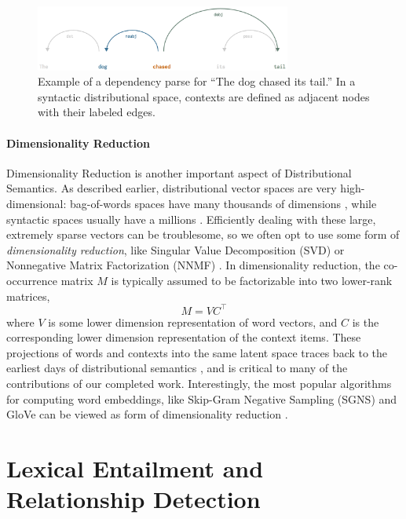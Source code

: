 \begin{figure}
  \centering
  \includegraphics[width=0.75\textwidth]{figures/syn}
\caption{Example of a dependency parse for ``The dog chased its tail.'' In
a syntactic distributional space, contexts are defined as adjacent nodes
with their labeled edges.}
\label{fig:syn}
\end{figure}

\paragraph{Dimensionality Reduction}
Dimensionality Reduction is another important aspect of Distributional Semantics.
As described earlier, distributional vector
spaces are very high-dimensional: bag-of-words spaces have many thousands of
dimensions \cite{turney:2010:jair,mikolov:2013:iclr,pennington:2014:emnlp},
while syntactic spaces usually have a millions \cite{baroni:2010:cl}.
Efficiently dealing with these large, extremely sparse vectors can be
troublesome, so we often opt to use some form of {\em dimensionality
reduction}, like Singular Value Decomposition (SVD)
\cite{deerwester:1990:jsis,landauer:1997:pr} or Nonnegative Matrix
Factorization (NNMF) \cite{lee:2000:nips}. In dimensionality reduction, the
co-occurrence matrix $M$ is typically assumed to be factorizable into two
lower-rank matrices,
\begin{equation}
  M = VC^{\top}
  \label{eqn:svd}
\end{equation}
where $V$ is some lower dimension representation of word vectors, and $C$ is
the corresponding lower dimension representation of the context items. These
projections of words and contexts into the same latent space traces back to the
earliest days of distributional semantics \cite{deerwester:1990:jsis}, and is
critical to many of the contributions of our completed work.  Interestingly,
the most popular algorithms for computing word embeddings, like Skip-Gram
Negative Sampling (SGNS) \cite{mikolov:2013:iclr} and GloVe
\cite{pennington:2014:emnlp} can be viewed as form of dimensionality reduction
\cite{levy:2014:nips,levy:2015:tacl}.

\section{Lexical Entailment and Relationship Detection}

